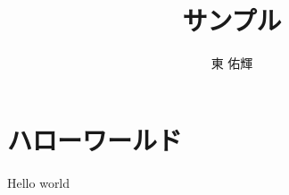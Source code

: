 \documentclass[a4j]{jarticle}
\title{サンプル}
\author{東 佑輝}
\begin{document}
\maketitle

\section{ハローワールド}
Hello world
\end{document}
